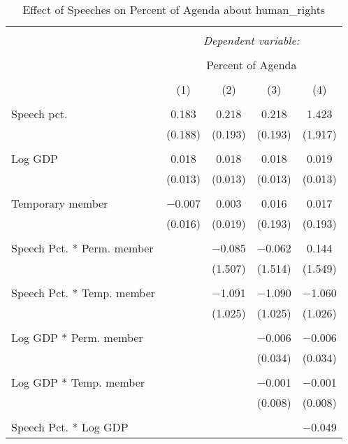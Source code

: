 
\begin{table}[!htbp] \centering 
  \caption{Effect of Speeches on Percent of Agenda about  human_rights} 
  \label{} 
\begin{tabular}{@{\extracolsep{5pt}}lcccc} 
\\[-1.8ex]\hline 
\hline \\[-1.8ex] 
 & \multicolumn{4}{c}{\textit{Dependent variable:}} \\ 
\cline{2-5} 
\\[-1.8ex] & \multicolumn{4}{c}{Percent of Agenda} \\ 
\\[-1.8ex] & (1) & (2) & (3) & (4)\\ 
\hline \\[-1.8ex] 
 Speech pct. & 0.183 & 0.218 & 0.218 & 1.423 \\ 
  & (0.188) & (0.193) & (0.193) & (1.917) \\ 
  & & & & \\ 
 Log GDP & 0.018 & 0.018 & 0.018 & 0.019 \\ 
  & (0.013) & (0.013) & (0.013) & (0.013) \\ 
  & & & & \\ 
 Temporary member & $-$0.007 & 0.003 & 0.016 & 0.017 \\ 
  & (0.016) & (0.019) & (0.193) & (0.193) \\ 
  & & & & \\ 
 Speech Pct. * Perm. member &  & $-$0.085 & $-$0.062 & 0.144 \\ 
  &  & (1.507) & (1.514) & (1.549) \\ 
  & & & & \\ 
 Speech Pct. * Temp. member &  & $-$1.091 & $-$1.090 & $-$1.060 \\ 
  &  & (1.025) & (1.025) & (1.026) \\ 
  & & & & \\ 
 Log GDP * Perm. member &  &  & $-$0.006 & $-$0.006 \\ 
  &  &  & (0.034) & (0.034) \\ 
  & & & & \\ 
 Log GDP * Temp. member &  &  & $-$0.001 & $-$0.001 \\ 
  &  &  & (0.008) & (0.008) \\ 
  & & & & \\ 
 Speech Pct. * Log GDP &  &  &  & $-$0.049 \\ 

\end{tabular}
\end{table}
